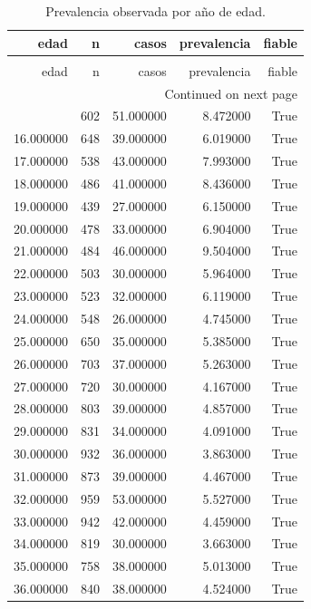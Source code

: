 \begin{longtable}{rrrrr}
\caption{Prevalencia observada por año de edad.} \label{tab:tabla_55_prevalencia_por_edad} \\
\toprule
edad & n & casos & prevalencia & fiable \\
\midrule
\endfirsthead
\caption[]{Prevalencia observada por año de edad.} \\
\toprule
edad & n & casos & prevalencia & fiable \\
\midrule
\endhead
\midrule
\multicolumn{5}{r}{Continued on next page} \\
\midrule
\endfoot
\bottomrule
\endlastfoot
15.000000 & 602 & 51.000000 & 8.472000 & True \\
16.000000 & 648 & 39.000000 & 6.019000 & True \\
17.000000 & 538 & 43.000000 & 7.993000 & True \\
18.000000 & 486 & 41.000000 & 8.436000 & True \\
19.000000 & 439 & 27.000000 & 6.150000 & True \\
20.000000 & 478 & 33.000000 & 6.904000 & True \\
21.000000 & 484 & 46.000000 & 9.504000 & True \\
22.000000 & 503 & 30.000000 & 5.964000 & True \\
23.000000 & 523 & 32.000000 & 6.119000 & True \\
24.000000 & 548 & 26.000000 & 4.745000 & True \\
25.000000 & 650 & 35.000000 & 5.385000 & True \\
26.000000 & 703 & 37.000000 & 5.263000 & True \\
27.000000 & 720 & 30.000000 & 4.167000 & True \\
28.000000 & 803 & 39.000000 & 4.857000 & True \\
29.000000 & 831 & 34.000000 & 4.091000 & True \\
30.000000 & 932 & 36.000000 & 3.863000 & True \\
31.000000 & 873 & 39.000000 & 4.467000 & True \\
32.000000 & 959 & 53.000000 & 5.527000 & True \\
33.000000 & 942 & 42.000000 & 4.459000 & True \\
34.000000 & 819 & 30.000000 & 3.663000 & True \\
35.000000 & 758 & 38.000000 & 5.013000 & True \\
36.000000 & 840 & 38.000000 & 4.524000 & True \\

\end{longtable}
